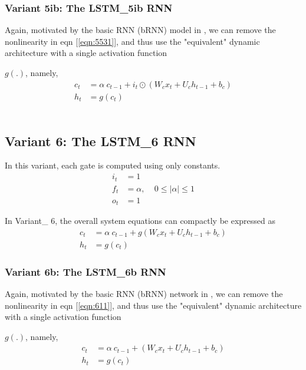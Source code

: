 \documentclass{article}
\begin{document}
{\subsubsection{Variant 5ib: The LSTM\_5ib RNN}
Again, motivated by the basic RNN (bRNN) model in \cite {salem2016basic}, we can remove the nonlinearity in eqn [\ref{eqn:5531}], and thus use the "equivalent" dynamic architecture with a single activation function {$g(.)$, namely,
\begin{align}
	\label{eqn:531}	c_t &=  \alpha ~ c_{t-1} + i_t \odot (W_c x_t + U_c h_{t-1} + b_c)\\
	\label{eqn:541}	h_t &=  g(c_t)
\end{align}
\\

\subsection{Variant 6: The LSTM\_6 RNN}
In this variant, each gate is computed using only constants.
\begin{align}
	i_t &= 1 \\
	f_t &= \alpha , ~~~~~  0 \leq |\alpha| \leq  1 \\
	o_t &= 1
\end{align}

In {Variant\_ 6}, the overall system equations can compactly be expressed as
\begin{align}
	\label{eqn:611}   c_t &= \alpha ~ c_{t-1} + g(W_c x_t + U_c h_{t-1} + b_c) \\
	\label{eqn:612}	 h_t &=  g(c_t)
\end{align}

\subsubsection{Variant 6b: The LSTM\_6b RNN}
Again, motivated by the basic RNN (bRNN) network in \cite {salem2016basic}, we can remove the nonlinearity in eqn [\ref{eqn:611}], and thus use the "equivalent" dynamic architecture with a single activation function {$g(.)$, namely,
\begin{align}
	\label{eqn:611}   c_t &= \alpha ~ c_{t-1} + (W_c x_t + U_c h_{t-1} + b_c) \\
	\label{eqn:612}	 h_t &=  g(c_t)
\end{align}

}}}
\end{document}
